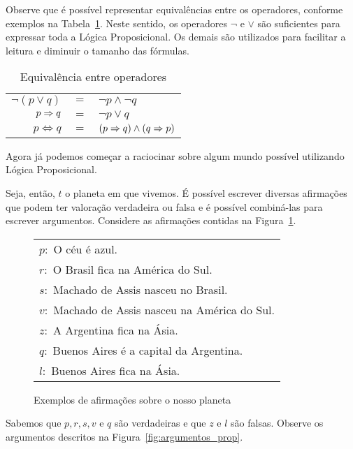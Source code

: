 Observe que é possível representar equivalências entre os operadores, conforme
exemplos na Tabela~\ref{tab:equivalencia}.  Neste sentido, os operadores $\neg$
e $\vee$ são suficientes para expressar toda a Lógica Proposicional. Os demais
são utilizados para facilitar a leitura e diminuir o tamanho das fórmulas.

\begin{table}[!h]
\label{tab:equivalencia}
\caption{Equivalência entre operadores}
\begin{center}
\begin{tabular}{|rcl|}
   \hline  
   $\neg (p \vee q)$ & $=$ & $\neg p \wedge \neg q$ \\
   $p \Rightarrow q$ & $=$ & $\neg p \vee q$ \\
   $p \iff q$ & $=$ & $(p \Rightarrow q) \wedge (q \Rightarrow p)$ \\
   \hline
\end{tabular}
\end{center}
\end{table}

Agora já podemos começar a raciocinar sobre algum mundo possível utilizando
Lógica Proposicional. 

Seja, então, $t$ o planeta em que vivemos. É possível escrever diversas
afirmações que podem ter valoração verdadeira ou falsa e é possível combiná-las
para escrever argumentos. Considere as afirmações contidas na
Figura~\ref{fig:prop}.

\begin{figure}[!tbh]
\label{fig:prop}
\begin{center}
\begin{tabular}{|l|}
   \hline  
   $p:$ O céu é azul.\\
   $r:$ O Brasil fica na América do Sul.\\
   $s:$ Machado de Assis nasceu no Brasil.\\
   $v:$ Machado de Assis nasceu na América do Sul.\\
   $z:$ A Argentina fica na Ásia.\\
   $q:$ Buenos Aires é a capital da Argentina.\\
   $l:$ Buenos Aires fica na Ásia.\\
   \hline
\end{tabular}
\end{center}
\caption{Exemplos de afirmações sobre o nosso planeta}
\end{figure}

Sabemos que $p,r,s,v$ e $q$ são verdadeiras e que $z$ e $l$ são falsas. Observe
os argumentos descritos na Figura~\ref{fig:argumentos_prop}. 

